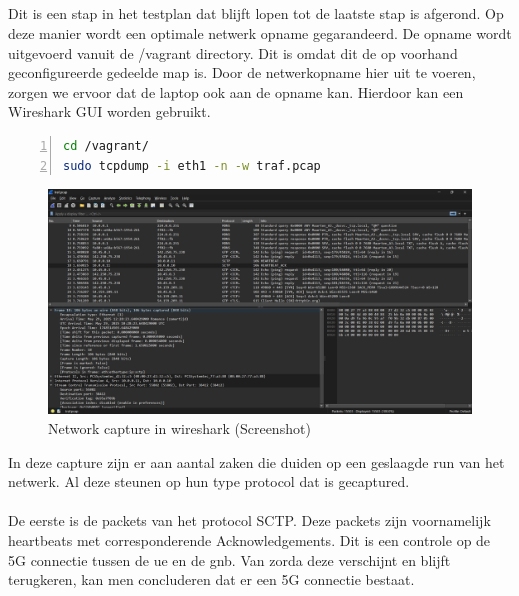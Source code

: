 \subsection{}%
\label{sec:Test-capture}%

Dit is een stap in het testplan dat blijft lopen tot de laatste stap is afgerond. Op deze manier wordt een optimale netwerk opname gegarandeerd. De opname wordt uitgevoerd vanuit de /vagrant directory. Dit is omdat dit de op voorhand geconfigureerde gedeelde map is. Door de netwerkopname hier uit te voeren, zorgen we ervoor dat de laptop ook aan de opname kan. Hierdoor kan een Wireshark GUI worden gebruikt.

\begin{lstlisting}[basicstyle=\small, frame=single, breaklines=true, postbreak=\mbox{\textcolor{red}{$\hookrightarrow$}\space}, escapeinside ={\%,}, escapechar={!}, numbers=left, language=sh, caption=Test - Tcpdump]
cd /vagrant/
sudo tcpdump -i eth1 -n -w traf.pcap
\end{lstlisting}

\begin{figure}[H]
    \includegraphics[width=\linewidth]{../graphics/POC-wireshark.png}
    \caption{Network capture in wireshark (Screenshot)}
    \label{fig:wireshark}
\end{figure}

In deze capture zijn er aan aantal zaken die duiden op een geslaagde run van het netwerk. Al deze steunen op hun type protocol dat is gecaptured.\\\\

De eerste is de packets van het protocol SCTP. Deze packets zijn voornamelijk heartbeats met corresponderende Acknowledgements. Dit is een controle op de 5G connectie tussen de \gls{ue} en de \gls{gnb}. Van zorda deze verschijnt en blijft terugkeren, kan men concluderen dat er een 5G connectie bestaat.\\


